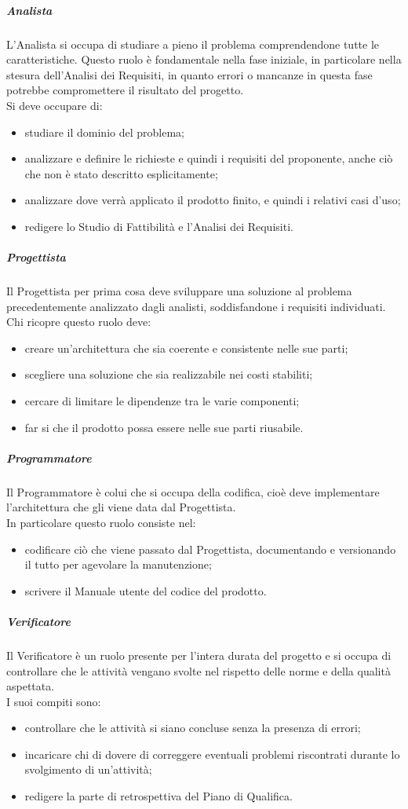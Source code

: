 \subparagraph{Analista}
L'Analista si occupa di studiare a pieno il problema comprendendone tutte le caratteristiche. Questo ruolo è fondamentale nella fase iniziale, in particolare nella stesura dell'Analisi dei Requisiti, in quanto errori o mancanze in questa fase potrebbe compromettere il risultato del progetto.\\
Si deve occupare di:
\begin{itemize}
    \item studiare il dominio del problema;
    \item analizzare e definire le richieste e quindi i requisiti del proponente, anche ciò che non è stato descritto esplicitamente;
    \item analizzare dove verrà applicato il prodotto finito, e quindi i relativi casi d'uso;
    \item redigere lo Studio di Fattibilità e l'Analisi dei Requisiti.
\end{itemize}

\subparagraph{Progettista}
Il Progettista per prima cosa deve sviluppare una soluzione al problema precedentemente analizzato dagli analisti, soddisfandone i requisiti individuati.\\
Chi ricopre questo ruolo deve:
\begin{itemize}
    \item creare un'architettura che sia coerente e consistente nelle sue parti;
    \item scegliere una soluzione che sia realizzabile nei costi stabiliti;
    \item cercare di limitare le dipendenze tra le varie componenti;
    \item far si che il prodotto possa essere nelle sue parti riusabile.
\end{itemize}

\subparagraph{Programmatore}
Il Programmatore è colui che si occupa della codifica, cioè deve implementare l'architettura che gli viene data dal Progettista.\\
In particolare questo ruolo consiste nel:
\begin{itemize}
    \item codificare ciò che viene passato dal Progettista, documentando e versionando il tutto per agevolare la manutenzione;
    \item scrivere il Manuale utente del codice del prodotto.
\end{itemize}

\subparagraph{Verificatore}
Il Verificatore è un ruolo presente per l'intera durata del progetto e si occupa di controllare che le attività vengano svolte nel rispetto delle norme e della qualità aspettata.\\
I suoi compiti sono:
\begin{itemize}
    \item controllare che le attività si siano concluse senza la presenza di errori;
    \item incaricare chi di dovere di correggere eventuali problemi riscontrati durante lo svolgimento di un'attività;
    \item redigere la parte di retrospettiva del Piano di Qualifica.
\end{itemize}

